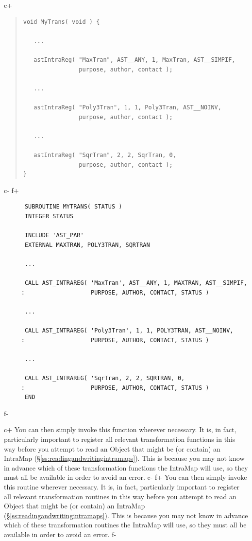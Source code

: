 \documentclass[twoside,11pt]{article}
\newcommand{\secref}[1]{\S\ref{#1}}
\newcommand{\secref}[1]{\ref{#1}}
\begin{document}
c+
\begin{quote}
\small
\begin{verbatim}
void MyTrans( void ) {

   ...

   astIntraReg( "MaxTran", AST__ANY, 1, MaxTran, AST__SIMPIF,
                purpose, author, contact );

   ...

   astIntraReg( "Poly3Tran", 1, 1, Poly3Tran, AST__NOINV,
                purpose, author, contact );

   ...

   astIntraReg( "SqrTran", 2, 2, SqrTran, 0,
                purpose, author, contact );
}
\end{verbatim}
\normalsize
\end{quote}
c-
f+
\small
\begin{verbatim}
      SUBROUTINE MYTRANS( STATUS )
      INTEGER STATUS

      INCLUDE 'AST_PAR'
      EXTERNAL MAXTRAN, POLY3TRAN, SQRTRAN

      ...

      CALL AST_INTRAREG( 'MaxTran', AST__ANY, 1, MAXTRAN, AST__SIMPIF,
     :                   PURPOSE, AUTHOR, CONTACT, STATUS )

      ...

      CALL AST_INTRAREG( 'Poly3Tran', 1, 1, POLY3TRAN, AST__NOINV,
     :                   PURPOSE, AUTHOR, CONTACT, STATUS )

      ...

      CALL AST_INTRAREG( 'SqrTran, 2, 2, SQRTRAN, 0,
     :                   PURPOSE, AUTHOR, CONTACT, STATUS )
      END
\end{verbatim}
\normalsize
f-

c+
You can then simply invoke this function wherever necessary. It is, in
fact, particularly important to register all relevant transformation
functions in this way before you attempt to read an Object that might
be (or contain) an IntraMap
(\secref{ss:readingandwritingintramaps}). This is because you may not
know in advance which of these transformation functions the IntraMap
will use, so they must all be available in order to avoid an error.
c-
f+
You can then simply invoke this routine wherever necessary. It is, in
fact, particularly important to register all relevant transformation
routines in this way before you attempt to read an Object that might
be (or contain) an IntraMap
(\secref{ss:readingandwritingintramaps}). This is because you may not
know in advance which of these transformation routines the IntraMap
will use, so they must all be available in order to avoid an error.
f-
\end{document}
